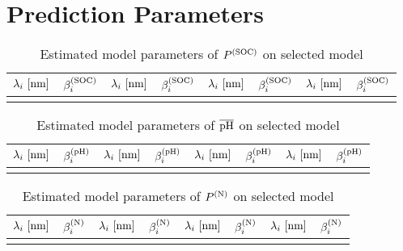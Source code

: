 \section{Prediction Parameters}
\label{sec:parameters}
	
	\begin{table}[H]
		\center
		\caption{Estimated model parameters of $P^{\mathrm{(SOC)}}$ on selected model}
		\setlength{\extrarowheight}{1.9pt}
		\begin{tabular}{rr|rr|rr|rr}
			\hline
			$\lambda_i \ [\m{nm}]$ & $\beta^{\mathrm{(SOC)}}_i$ & $\lambda_i \ [\m{nm}]$ & $\beta^{\mathrm{(SOC)}}_i$ & $\lambda_i \ [\m{nm}]$ & $\beta^{\mathrm{(SOC)}}_i$ & $\lambda_i \ [\m{nm}]$ & $\beta^{\mathrm{(SOC)}}_i$ \\
			\hline
			\hline
			
			\hline \\
		\end{tabular}
	\end{table}

	\begin{table}[H]
		\center
		\caption{Estimated model parameters of $\overline{\mathrm{pH}}$ on selected model}
		\setlength{\extrarowheight}{1.9pt}
		\begin{tabular}{rr|rr|rr|rr}
			\hline
			$\lambda_i \ [\m{nm}]$ & $\beta^{\mathrm{(pH)}}_i$ & $\lambda_i \ [\m{nm}]$ & $\beta^{\mathrm{(pH)}}_i$ & $\lambda_i \ [\m{nm}]$ & $\beta^{\mathrm{(pH)}}_i$ & $\lambda_i \ [\m{nm}]$ & $\beta^{\mathrm{(pH)}}_i$ \\
			\hline
			\hline
			
			\hline \\
		\end{tabular}
	\end{table}

	\begin{table}[H]
		\center
		\caption{Estimated model parameters of $P^{\mathrm{(N)}}$ on selected model}
		\setlength{\extrarowheight}{1.9pt}
		\begin{tabular}{rr|rr|rr|rr}
			\hline
			$\lambda_i \ [\m{nm}]$ & $\beta^{\mathrm{(N)}}_i$ & $\lambda_i \ [\m{nm}]$ & $\beta^{\mathrm{(N)}}_i$ & $\lambda_i \ [\m{nm}]$ & $\beta^{\mathrm{(N)}}_i$ & $\lambda_i \ [\m{nm}]$ & $\beta^{\mathrm{(N)}}_i$ \\
			\hline
			\hline
			
			\hline \\
		\end{tabular}
	\end{table}

